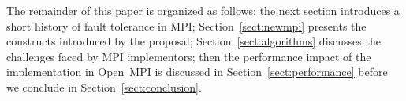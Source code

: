 The remainder of this paper is organized as follows: the next section introduces
a short history of fault tolerance in MPI; Section~\ref{sect:newmpi} presents
the constructs introduced by the proposal; Section~\ref{sect:algorithms}
discusses the challenges faced by MPI implementors; then the performance impact
of the implementation in Open~MPI is discussed in Section~\ref{sect:performance}
before we conclude in Section~\ref{sect:conclusion}.
